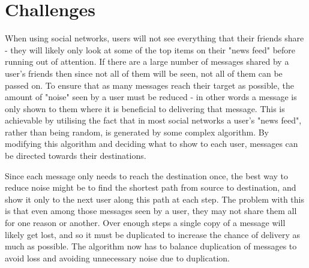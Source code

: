 \documentclass[bsc,frontabs,twoside,singlespacing,parskip,deptreport]{infthesis}     %
\begin{document}
\section{Challenges}
When using social networks, users will not see everything that their friends share - they will likely only look at some of the top items on their "news feed" before running out of attention. If there are a large number of messages shared by a user's friends then since not all of them will be seen, not all of them can be passed on. To ensure that as many messages reach their target as possible, the amount of "noise" seen by a user must be reduced - in other words a message is only shown to them where it is beneficial to delivering that message. This is achievable by utilising the fact that in most social networks a user's "news feed", rather than being random, is generated by some complex algorithm. By modifying this algorithm and deciding what to show to each user, messages can be directed towards their destinations.

Since each message only needs to reach the destination once, the best way to reduce noise might be to find the shortest path from source to destination, and show it only to the next user along this path at each step. The problem with this is that even among those messages seen by a user, they may not share them all for one reason or another. Over enough steps a single copy of a message will likely get lost, and so it must be duplicated to increase the chance of delivery as much as possible. The algorithm now has to balance duplication of messages to avoid loss and avoiding unnecessary noise due to duplication.
\end{document}
